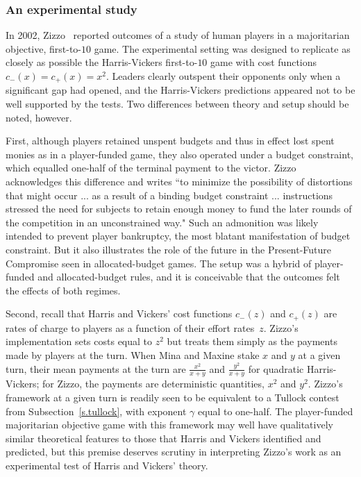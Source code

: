 \documentclass[letterpaper,11pt,oneside,reqno]{amsbook}
\numberwithin{figure}{chapter}
\theoremstyle{definition}
\theoremstyle{definition}
\theoremstyle{definition}
\theoremstyle{definition}
\theoremstyle{definition}
\begin{document}
 
 \medskip
 
 \subsubsection{An experimental study} 
 
 In 2002, Zizzo~\cite{Zizzo} reported outcomes of a study of human players in a majoritarian objective, first-to-$10$ game.
 The experimental setting was designed to replicate as closely as possible the 
  Harris-Vickers first-to-$10$ game 
   with cost functions $c_-(x) = c_+(x) = x^2$. Leaders clearly outspent their opponents
   only when a significant gap had opened, and the Harris-Vickers predictions appeared not to be well supported by the tests. Two differences between theory and setup should be noted, however.
   
   First, although players retained unspent budgets and thus in effect lost spent monies as  in a player-funded game, they also operated under a budget constraint, which equalled one-half of the terminal payment to the victor. Zizzo acknowledges this difference and writes  ``to minimize the possibility of distortions that might occur ... as a result of a binding budget constraint ... instructions stressed the need for subjects to
retain enough money to fund the later rounds of the competition in an unconstrained way." Such an admonition was likely intended to prevent player bankruptcy, the most blatant manifestation of budget constraint. But it also illustrates the role of the future in the Present-Future Compromise seen in allocated-budget games. The setup was a hybrid of player-funded and allocated-budget rules, and it is conceivable that the outcomes felt the effects of both regimes.

Second, recall that Harris and Vickers' cost functions $c_-(z)$ and $c_+(z)$ are rates of charge to players as a function of their effort rates~$z$. Zizzo's implementation sets costs equal to $z^2$ but treats them simply as the payments made by players at the turn. When Mina and Maxine stake $x$ and $y$ at a given turn, their mean payments at the turn  are $\tfrac{x^2}{x+y}$ and  $\tfrac{y^2}{x+y}$ for quadratic Harris-Vickers; for Zizzo, the payments are deterministic quantities, $x^2$ and $y^2$. Zizzo's framework at a given turn is readily seen to be equivalent to a Tullock contest from Subsection~\ref{s.tullock}, with exponent $\gamma$ equal to one-half.
The player-funded majoritarian objective game with this framework may well have qualitatively similar theoretical features to those that Harris and Vickers identified and predicted, but this premise deserves scrutiny in interpreting Zizzo's work as an experimental test of Harris and Vickers' theory.   
   
\end{document}
